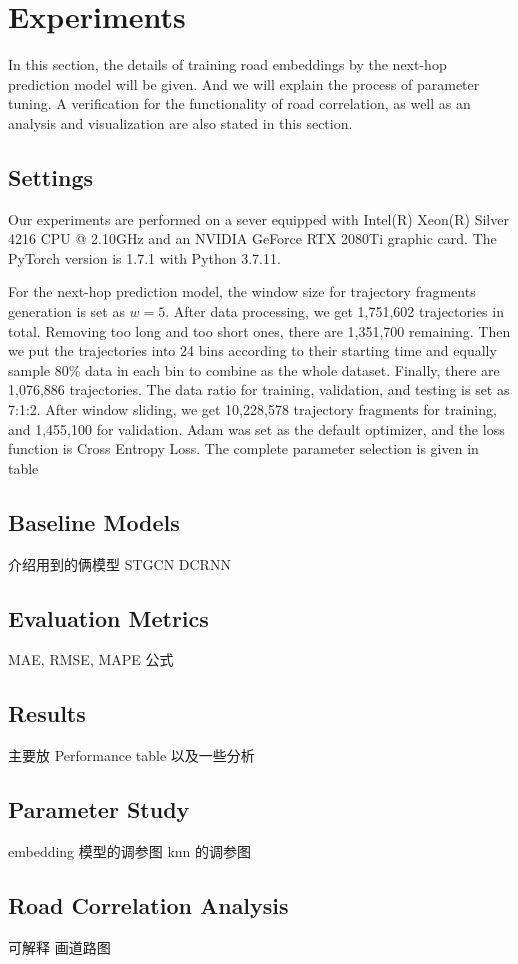 
\section{Experiments}
In this section, the details of training road embeddings by the next-hop prediction model will be given. And we will explain the process of parameter tuning. A verification for the functionality of road correlation, as well as an analysis and visualization are also stated in this section.

\subsection{Settings}
Our experiments are performed on a sever equipped with Intel(R) Xeon(R) Silver 4216 CPU @ 2.10GHz and an NVIDIA GeForce RTX 2080Ti graphic card. The PyTorch version is 1.7.1 with Python 3.7.11.

For the next-hop prediction model, the window size for trajectory fragments generation is set as $w=5$. After data processing, we get 1,751,602 trajectories in total. Removing too long and too short ones, there are 1,351,700 remaining. Then we put the trajectories into 24 bins according to their starting time and equally sample 80\% data in each bin to combine as the whole dataset. Finally, there are 1,076,886 trajectories. The data ratio for training, validation, and testing is set as 7:1:2. After window sliding, we get 10,228,578 trajectory fragments for training, and 1,455,100 for validation. Adam was set as the default optimizer, and the loss function is Cross Entropy Loss. The complete parameter selection is given in table

\subsection{Baseline Models}
介绍用到的俩模型 STGCN DCRNN

\subsection{Evaluation Metrics}
MAE, RMSE, MAPE 公式

\subsection{Results}
主要放 Performance table
以及一些分析

\subsection{Parameter Study}
embedding 模型的调参图
knn 的调参图

\subsection{Road Correlation Analysis}
可解释
画道路图
